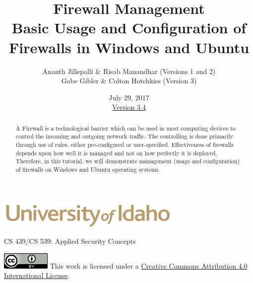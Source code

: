 \documentclass[12pt]{extarticle}
\begin{document}
\title{ Firewall Management\\ \normalsize Basic Usage and Configuration of Firewalls in Windows and Ubuntu}
\author{ Ananth Jillepalli \& Risab Manandhar (Versions 1 and 2) \\Gabe Gibler \& Colton Hotchkiss (Version 3) }
\date{July 29, 2017 \\ \hyperref[changelog]{Version 3.4}}
\renewcommand{\abstractname}{Summary}
\begin{titlepage}
\maketitle
{}
\begin{center}
\includegraphics[scale=.5]{UofI}

\large{CS 439/CS 539: Applied Security Concepts}

\vskip 40pt

\end{center}
\begin{abstract}
A Firewall is a technological barrier which can be used in most computing devices to control the incoming and outgoing network traffic. The controlling is done primarily through use of rules, either pre-configured or user-specified. Effectiveness of firewalls depends upon how well it is managed and not on how perfectly it is deployed. Therefore, in this tutorial, we will demonstrate management (usage and configuration) of firewalls on Windows and Ubuntu operating systems.  
\end{abstract}


\vfill
\begin{center}
	\includegraphics[scale=0.5]{cc}
	\vskip 10pt
	This work is licensed under a \href{https://creativecommons.org/licenses/by/4.0/}{Creative Commons Attribution 4.0 International License}.
\end{center}

\end{titlepage}


\pagebreak
\tableofcontents

\end{document}

